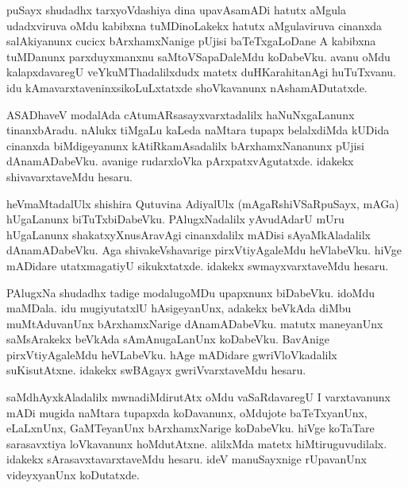\documentclass{article}
\begin{document}
\begin{mn}
puSayx  shudadhx  tarxyoVdashiya  dina  upavAsamADi  hatutx  aMgula  udadxviruva  oMdu  kabibxna  
tuMDinoLakekx  hatutx  aMgulaviruva  cinanxda  salAkiyanunx  cucicx  bArxhamxNanige  pUjisi  
baTeTxgaLoDane  A  kabibxna  tuMDanunx  parxduyxmanxnu  saMtoVSapaDaleMdu  koDabeVku.  avanu  
oMdu  kalapxdavaregU  veYkuMThadalilxdudx  matetx  duHKarahitanAgi  huTuTxvanu.  idu  
kAmavarxtaveninxsikoLuLxtatxde  shoVkavanunx  nAshamADutatxde.
\end{mn}

\begin{mn}
ASADhaveV  modalAda  cAtumARsasayxvarxtadalilx  haNuNxgaLanunx  tinanxbAradu.  
nAlukx tiMgaLu  kaLeda  naMtara  tupapx  belalxdiMda  kUDida  cinanxda  
biMdigeyanunx  kAtiRkamAsadalilx  bArxhamxNananunx  pUjisi  dAnamADabeVku.  
avanige  rudarxloVka  pArxpatxvAgutatxde.  idakekx  shivavarxtaveMdu  hesaru.
\end{mn}

\begin{mn}
heVmaMtadalUlx  shishira Qutuvina  AdiyalUlx  (mAgaRshiVSaRpuSayx,  mAGa) hUgaLanunx  
biTuTxbiDabeVku.  PAlugxNadalilx  yAvudAdarU  mUru  hUgaLanunx  shakatxyXnusAravAgi  
cinanxdalilx  mADisi  sAyaMkAladalilx  dAnamADabeVku.  Aga  shivakeVshavarige  
pirxVtiyAgaleMdu  heVlabeVku.  hiVge  mADidare  utatxmagatiyU  sikukxtatxde.  
idakekx  swmayxvarxtaveMdu  hesaru.
\end{mn}

\begin{mn}
PAlugxNa  shudadhx  tadige  modalugoMDu  upapxnunx  biDabeVku.  idoMdu  maMDala.  idu  
mugiyutatxlU  hAsigeyanUnx,  adakekx  beVkAda  diMbu  muMtAduvanUnx  bArxhamxNarige  
dAnamADabeVku.  matutx  maneyanUnx  saMsArakekx  beVkAda  sAmAnugaLanUnx  koDabeVku.  
BavAnige  pirxVtiyAgaleMdu  heVLabeVku.  hAge  mADidare  gwriVloVkadalilx  suKisutAtxne.  
idakekx  swBAgayx gwriVvarxtaveMdu  hesaru.
\end{mn}

\begin{mn}
saMdhAyxkAladalilx  mwnadiMdirutAtx  oMdu  vaSaRdavaregU  I  varxtavanunx  mADi  mugida  
naMtara  tupapxda  koDavanunx,  oMdujote  baTeTxyanUnx,  eLaLxnUnx,  GaMTeyanUnx  
bArxhamxNarige  koDabeVku.  hiVge koTaTare  sarasavxtiya  loVkavanunx  hoMdutAtxne.  
alilxMda  matetx  hiMtiruguvudilalx.  idakekx  sArasavxtavarxtaveMdu  hesaru.  ideV  
manuSayxnige  rUpavanUnx  videyxyanUnx  koDutatxde.
\end{mn}
\end{document}
